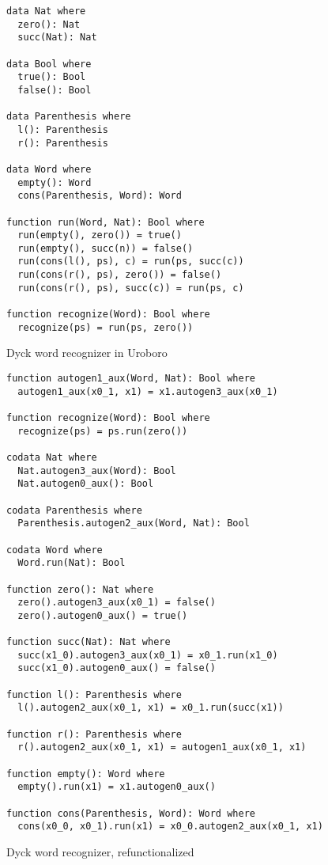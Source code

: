 \begin{figure}

\begin{lstlisting}
data Nat where
  zero(): Nat
  succ(Nat): Nat

data Bool where
  true(): Bool
  false(): Bool

data Parenthesis where
  l(): Parenthesis
  r(): Parenthesis

data Word where
  empty(): Word
  cons(Parenthesis, Word): Word

function run(Word, Nat): Bool where
  run(empty(), zero()) = true()
  run(empty(), succ(n)) = false()
  run(cons(l(), ps), c) = run(ps, succ(c))
  run(cons(r(), ps), zero()) = false()
  run(cons(r(), ps), succ(c)) = run(ps, c)

function recognize(Word): Bool where
  recognize(ps) = run(ps, zero())
\end{lstlisting}
\caption{Dyck word recognizer in Uroboro}
\label{fig:dyck}
\end{figure}

\begin{figure}
\begin{lstlisting}
function autogen1_aux(Word, Nat): Bool where
  autogen1_aux(x0_1, x1) = x1.autogen3_aux(x0_1)

function recognize(Word): Bool where
  recognize(ps) = ps.run(zero())

codata Nat where
  Nat.autogen3_aux(Word): Bool
  Nat.autogen0_aux(): Bool

codata Parenthesis where
  Parenthesis.autogen2_aux(Word, Nat): Bool

codata Word where
  Word.run(Nat): Bool

function zero(): Nat where
  zero().autogen3_aux(x0_1) = false()
  zero().autogen0_aux() = true()

function succ(Nat): Nat where
  succ(x1_0).autogen3_aux(x0_1) = x0_1.run(x1_0)
  succ(x1_0).autogen0_aux() = false()

function l(): Parenthesis where
  l().autogen2_aux(x0_1, x1) = x0_1.run(succ(x1))

function r(): Parenthesis where
  r().autogen2_aux(x0_1, x1) = autogen1_aux(x0_1, x1)

function empty(): Word where
  empty().run(x1) = x1.autogen0_aux()

function cons(Parenthesis, Word): Word where
  cons(x0_0, x0_1).run(x1) = x0_0.autogen2_aux(x0_1, x1)
\end{lstlisting}
\caption{Dyck word recognizer, refunctionalized}
\label{fig:dyckrefunced}
\end{figure}

